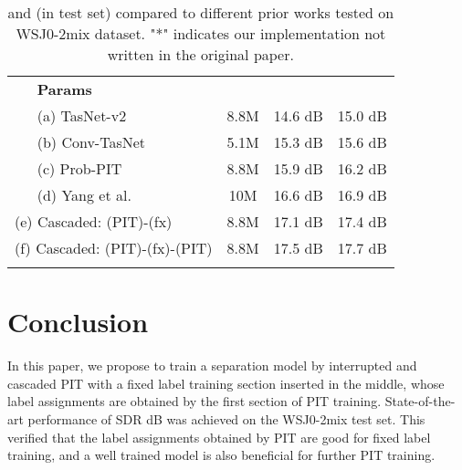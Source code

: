 \documentclass{article}
\begin{document}
\begin{table}[t]
  \caption{\small  and  (in test set) compared to different prior works tested on WSJ0-2mix dataset. "*" indicates our implementation not written in the original paper.}
  \label{prior}
  \centering
  \small
  \begin{tabular}{|c|l|c|c|c|}
    \Xhline{2\arrayrulewidth}
    \rowcolor{gray!20}
    \multicolumn{2}{|c|}{\textbf{Approaches}} & \textbf{Params} &  \textbf{} &  \textbf{} \\
    \Xhline{2\arrayrulewidth}
    \multirow{4}{*}{\rotatebox[origin=c]{90}{prior works}}
    & (a) TasNet-v2 \cite{luo2018tasnet} &  8.8{\scriptsize M} & 14.6 {\scriptsize dB} & 15.0 {\scriptsize dB} \\
& (b) Conv-TasNet \cite{luo2019conv} &  5.1{\scriptsize M} & 15.3 {\scriptsize dB} & 15.6 {\scriptsize dB} \\
    & (c) Prob-PIT \cite{Yousefi2019} &  8.8{\scriptsize M} & 15.9  {\scriptsize dB} & 16.2 {\scriptsize dB} \\
    & (d) Yang et al. \cite{Yang2019} &  10{\scriptsize M}  & 16.6 {\scriptsize dB}  & 16.9 {\scriptsize dB} \\
    \hline
    \multicolumn{2}{|l|}{(e) \small{Cascaded:} (PIT)-(fx)} &  8.8{\scriptsize M}  & 17.1 {\scriptsize dB}  & 17.4 {\scriptsize dB} \\
    \multicolumn{2}{|l|}{(f) \small{Cascaded:} (PIT)-(fx)-(PIT)} &  8.8{\scriptsize M}  & 17.5 {\scriptsize dB}  & 17.7 {\scriptsize dB} \\
    \Xhline{2\arrayrulewidth}
  \end{tabular}
\end{table}

\vspace{-7pt}
\section{Conclusion}
\vspace{-7pt}
In this paper, we propose to train a separation model by interrupted and cascaded PIT with a fixed label training section inserted in the middle, whose label assignments are obtained by the first section of PIT training. State-of-the-art performance of SDR dB was achieved on the WSJ0-2mix test set. This verified that the label assignments obtained by PIT are good for fixed label training, and a well trained model is also beneficial for further PIT training.




\end{document}
